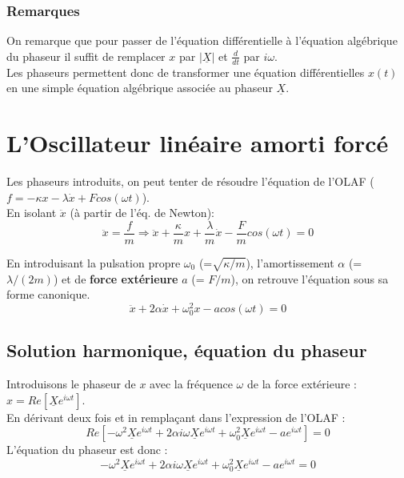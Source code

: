 \documentclass	[11pt, a4paper, openany]{book}
\begin{document}
	\subsubsection*{Remarques}
	On remarque que pour passer de l'équation différentielle à l'équation algébrique du phaseur il suffit de remplacer $x$ par $|\underline{X}|$ et $\frac{d}{dt}$ par $i\omega$.\\
	
	Les phaseurs permettent donc de transformer une équation différentielles $x(t)$ en une simple équation algébrique associée au phaseur $\underline{X}$.
	
	\section{L'Oscillateur linéaire amorti forcé}
	Les phaseurs introduits, on peut tenter de résoudre l'équation de l'OLAF ($f = -\kappa x - \lambda \dot{x} + Fcos(\omega t)$).\\
	En isolant $\ddot{x}$ (à partir de l'éq. de Newton):
	\begin{equation}
		\ddot{x} = \frac{f}{m} \Rightarrow \ddot{x} +\frac{\kappa}{m}x + \frac{\lambda}{m}\dot{x} - \frac{F}{m}cos(\omega t) = 0
	\end{equation}
	
	En introduisant la pulsation propre $\omega_0$ (=$\sqrt{\kappa/m}$), l'amortissement $\alpha$ (= $\lambda/(2m)$) et de \textbf{force extérieure} $a$ (= $F/m$), on retrouve l'équation sous sa forme canonique.
	\begin{equation}
		\ddot{x} + 2\alpha\dot{x} + \omega^2_0 x - a cos(\omega t) = 0
	\end{equation}
	
	\subsection{Solution harmonique, équation du phaseur}
	Introduisons le phaseur de $x$ avec la fréquence $\omega$ de la force extérieure :$x = Re\left[\underline{X}e^{i\omega t} \right]$.\\
	En dérivant deux fois et in remplaçant dans l'expression de l'OLAF :
	\begin{equation}
		Re\left[-\omega^2\underline{X}e^{i\omega t} + 2\alpha i \omega \underline{X}e^{i\omega t} + \omega_0^2 \underline{X}e^{i\omega t} - ae^{i\omega t}\right] = 0
	\end{equation}
	L'équation du phaseur est donc :
	\begin{equation}
		-\omega^2\underline{X}e^{i\omega t} + 2\alpha i \omega \underline{X}e^{i\omega t} + \omega_0^2 \underline{X}e^{i\omega t} - ae^{i\omega t} = 0
	\end{equation}
	
\end{document}
